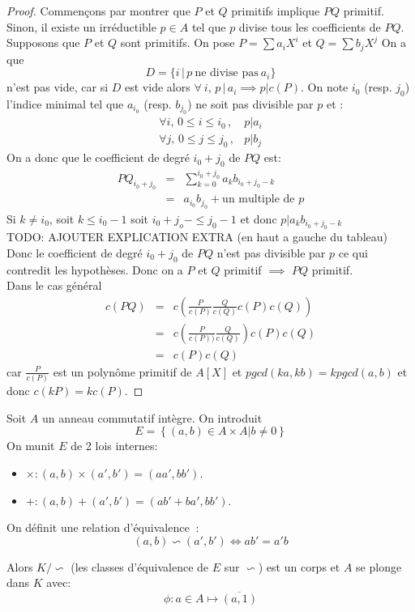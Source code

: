 \begin{proof}
	Commençons par montrer que $P$ et $Q$ primitifs implique $PQ$ primitif. \\
	Sinon, il existe un irréductible $p \in A $ tel que $p$ divise tous les coefficients de $PQ$. \\

	Supposons que $P$ et $Q$ sont primitifs. On pose $P = \sum a_iX^i$ et  $Q = \sum b_jX^j$
	On a que $$D = \{i \,|\, p\  \text{ne divise pas}\  a_i \}$$ n'est pas vide, car si $D$ est vide alors $ \forall\  i,\, p \,|\, a_i \implies p | c(P)$.
	On note $i_0$ (resp. $j_0$) l'indice minimal tel que $a_{i_0}$ (resp. $b_{j_0}$) ne soit pas divisible par $p$ et :
	\begin{eqnarray*}
		\forall i, \, 0 \leq i \leq i_0\,,& p | a_i \\
		\forall j, \, 0 \leq j \leq j_0\,,& p | b_j
	\end{eqnarray*}
	On a donc que le coefficient de degré $i_0 + j_0$ de $PQ$ est:
	\begin{eqnarray*}
		PQ_{i_0+j_0}&=& \sum\limits^{i_0 + j_0}_{k=0} a_k b_{i_0 + j_0 - k} \\
		&=& a_{i_0}b_{j_0} + \text{un multiple de } p
	\end{eqnarray*}
	Si $k \neq i_0$, soit  $k\leq i_0 -1$ soit $i_0+j_o - \leq j_0 -1$ et donc $ p | a_kb_{i_0 + j_0 - k}$\\
	TODO: AJOUTER EXPLICATION EXTRA (en haut a gauche du tableau) \\

	Donc le coefficient de degré $i_0+j_0$ de $PQ$ n'est pas divisible par $p$ ce qui contredit les hypothèses.
	Donc on a $P$ et $Q$ primitif $\implies$ $PQ$ primitif. \\
	Dans le cas général
	\begin{eqnarray*}
		c(PQ) &=& c\left(\frac{P}{c(P)}\frac{Q}{c(Q)}c(P)c(Q)\right)\\
		&=& c\left(\frac{P}{c(P))}\frac{Q}{c(Q)}\right)c(P)c(Q)\\
		&=& c(P)c(Q)
	\end{eqnarray*}
	car $\frac{P}{c(P)}$ est un polynôme primitif de $A[X]$ et
	$pgcd(ka, kb) = k pgcd(a,b)$ et donc $c(kP) = kc(P)$.
\end{proof}


\begin{definition}
	Soit $A$ un anneau  commutatif intègre.
	On introduit
	$$E = \left\{ (a,b) \in A\times A | b \neq 0 \right\}$$
	On munit  $E$ de 2 lois internes:
	\begin{itemize}
		\item $\times : (a,b) \times (a', b') = (aa',bb')$.
		\item $+ : (a,b) + (a', b') = (ab' + ba',bb')$.
	\end{itemize}

	On définit une relation d'équivalence $~$:
	$$ (a,b) \backsim  (a',b') \iff ab' = a'b $$

	Alors $K/\backsim $ (les classes d'équivalence de $E$ sur $\backsim$) est un corps et $A$ se plonge dans $K$ avec:
	$$\phi : a \in A  \mapsto \overline{(a,1)}$$
\end{definition}


